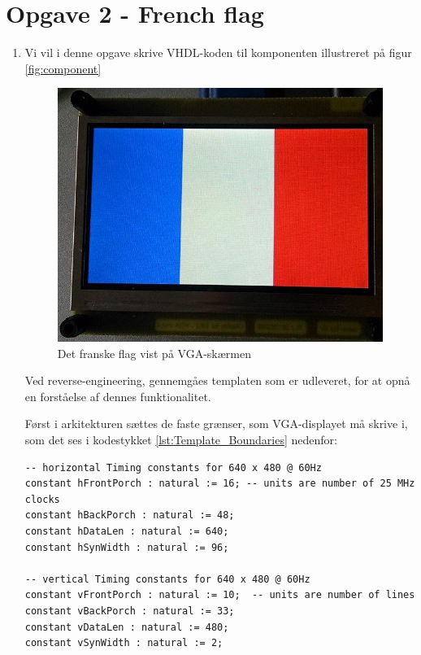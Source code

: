 \section{Opgave 2 - French flag}

\begin{enumerate}[1)]
\item 

	
Vi vil i denne opgave skrive VHDL-koden til komponenten illustreret på figur \ref{fig:component}
	\begin{figure}[h]
		\centering
		\includegraphics[scale=0.4]{pictures/Oevelse8/opg2/franskFlag}
		\caption{Det franske flag vist på VGA-skærmen}
		\label{fig:frenchFlag}
	\end{figure}

Ved reverse-engineering, gennemgåes templaten som er udleveret, for at opnå en forståelse af dennes funktionalitet.
	
Først i arkitekturen sættes de faste grænser, som VGA-displayet må skrive i, som det ses i kodestykket \ref{lst:Template_Boundaries} nedenfor:
	\begin{lstlisting}[caption={Template Boundaries},label={lst:Template_Boundaries}]
-- horizontal Timing constants for 640 x 480 @ 60Hz
constant hFrontPorch : natural := 16; -- units are number of 25 MHz clocks
constant hBackPorch : natural := 48; 
constant hDataLen : natural := 640;
constant hSynWidth : natural := 96;

-- vertical Timing constants for 640 x 480 @ 60Hz 
constant vFrontPorch : natural := 10;  -- units are number of lines
constant vBackPorch : natural := 33;
constant vDataLen : natural := 480;
constant vSynWidth : natural := 2;


\end{lstlisting}
\end{enumerate}
